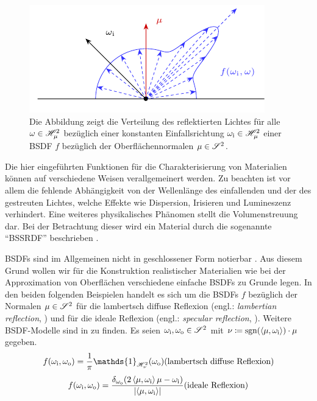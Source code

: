		\begin{figure}[h]
			\center
			\includegraphics{gg_fig/brdf_1.pdf}
			\caption{Die Abbildung zeigt die Verteilung des reflektierten Lichtes für alle $\omega\in\mathscr{H}^{2}_{\mu}$ bezüglich einer konstanten Einfallsrichtung $\omega_{\mathrm{i}}\in\mathscr{H}^{2}_{\mu}$ einer BSDF $f$ bezüglich der Oberflächennormalen $\mu\in\mathscr{S}^{2}$.}
			\label{fig:brdf}
		\end{figure}

		Die hier eingeführten Funktionen für die Charakterisierung von Materialien können auf verschiedene Weisen verallgemeinert werden.
		Zu beachten ist vor allem die fehlende Abhängigkeit von der Wellenlänge des einfallenden und der des gestreuten Lichtes, welche Effekte wie Dispersion, Irisieren und Lumineszenz verhindert.
		Eine weiteres physikalisches Phänomen stellt die Volumenstreuung dar.
		Bei der Betrachtung dieser wird ein Material durch die sogenannte \enquote{BSSRDF} beschrieben \cite[S.~671~ff]{pbrt3}.


		BSDFs sind im Allgemeinen nicht in geschlossener Form notierbar \cite[S.~507~f]{pbrt3}.
		Aus diesem Grund wollen wir für die Konstruktion realistischer Materialien wie bei der Approximation von Oberflächen verschiedene einfache BSDFs zu Grunde legen.
		In den beiden folgenden Beispielen handelt es sich um die BSDFs $f$ bezüglich der Normalen $\mu\in\mathscr{S}^{2}$ für die lambertsch diffuse Reflexion (engl.: \textit{lambertian reflection}, \cite[S.~531~f]{pbrt3}) und für die ideale Reflexion (engl.: \textit{specular reflection}, \cite[S.~144~f]{veach-thesis}).
		Weitere BSDF-Modelle sind in \cite{pbrt3,veach-thesis,radiosity} zu finden.
		Es seien $\omega_{\mathrm{i}},\omega_{\mathrm{o}}\in\mathscr{S}^{2}$ mit $\nu\coloneqq\operatorname{sgn}(\left\langle \mu,\omega_{\mathrm{i}} \right\rangle)\cdot\mu$ gegeben.
		\[
			f(\omega_\m{i},\omega_\m{o}) = \frac{1}{\pi}\mathds{1}_{\shs{\nu}}(\omega_\m{o}) \hfill \text{(lambertsch diffuse Reflexion)}
		\]
		\[
			f(\omega_\m{i},\omega_\m{o}) = \frac{\delta_{\omega_\m{o}}(2\dotp{\mu}{\omega_\m{i}}\mu - \omega_\m{i})}{\abs{\dotp{\mu}{\omega_\m{i}}}} \hfill \text{(ideale Reflexion)}
		\]

